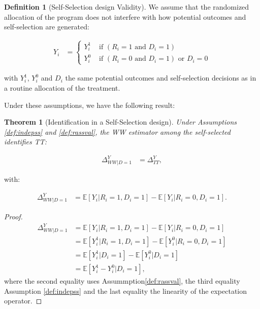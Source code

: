 \documentclass[
]{book}
\newcommand{\esp}[1]{\mathbb{E}[ #1 ]}
\newtheorem{theorem}{Theorem}[chapter]
\theoremstyle{definition}
\newtheorem{definition}{Definition}[chapter]
\theoremstyle{definition}
\theoremstyle{definition}
\theoremstyle{definition}
\theoremstyle{remark}
\begin{document}
\begin{definition}[Self-Selection design Validity]
\protect\hypertarget{def:rassval}{}{\label{def:rassval} \iffalse (Self-Selection design Validity) \fi{} }We assume that the randomized allocation of the program does not interfere with how potential outcomes and self-selection are generated:

\begin{align*}
Y_i & = 
  \begin{cases}
    Y_i^1 & \text{ if } (R_i=1 \text{ and } D_i=1)   \\
    Y_i^0 & \text{ if } (R_i=0 \text{ and } D_i=1) \text{ or } D_i=0
  \end{cases}
\end{align*}
\end{definition}

with \(Y_i^1\), \(Y_i^0\) and \(D_i\) the same potential outcomes and self-selection decisions as in a routine allocation of the treatment.

Under these assumptions, we have the following result:

\begin{theorem}[Identification in a Self-Selection design]
\protect\hypertarget{thm:idrass}{}{\label{thm:idrass} \iffalse (Identification in a Self-Selection design) \fi{} }Under Assumptions \ref{def:indepss} and \ref{def:rassval}, the WW estimator among the self-selected identifies TT:

\begin{align*}
  \Delta^Y_{WW|D=1} & = \Delta^Y_{TT},
\end{align*}
\end{theorem}

with:

\begin{align*}
  \Delta^Y_{WW|D=1} & = \esp{Y_i|R_i=1,D_i=1} - \esp{Y_i|R_i=0,D_i=1}.
\end{align*}

\begin{proof}
\iffalse{} {Proof. } \fi{}\begin{align*}
  \Delta^Y_{WW|D=1} & = \esp{Y_i|R_i=1,D_i=1} - \esp{Y_i|R_i=0,D_i=1} \\
                    & = \esp{Y^1_i|R_i=1,D_i=1} - \esp{Y^0_i|R_i=0,D_i=1} \\
                    & = \esp{Y_i^1|D_i=1}-\esp{Y_i^0|D_i=1}\\
                    & = \esp{Y_i^1-Y_i^0|D_i=1},
\end{align*}
where the second equality uses Assummption\ref{def:rassval}, the third equality Assumption \ref{def:indepss} and the last equality the linearity of the expectation operator.
\end{proof}
\end{document}
